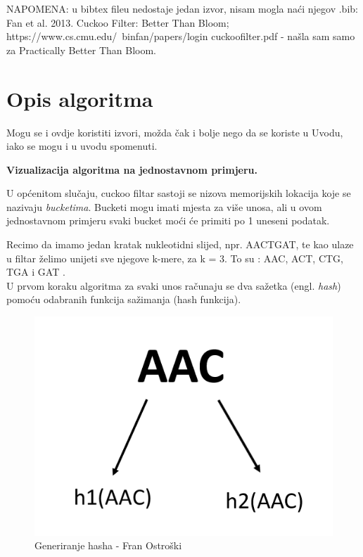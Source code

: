 \documentclass[times, utf8, seminar, numeric]{fer}
\begin{document}
NAPOMENA: u bibtex fileu nedostaje jedan izvor, nisam mogla naći njegov .bib: 
Fan et al. 2013. Cuckoo Filter: Better Than Bloom; https://www.cs.cmu.edu/~binfan/papers/login cuckoofilter.pdf - našla sam samo za Practically Better Than Bloom.

\chapter{Opis algoritma}
Mogu se i ovdje koristiti izvori, možda čak i bolje nego da se koriste u Uvodu, iako se mogu i u uvodu spomenuti.

\begin{flushleft}
\textbf{Vizualizacija algoritma na jednostavnom primjeru.}
\end{flushleft}


U općenitom slučaju, cuckoo filtar sastoji se nizova memorijskih lokacija koje se nazivaju \textit{bucketima}. Bucketi mogu imati mjesta za više unosa, ali u ovom jednostavnom primjeru svaki bucket moći će primiti  po 1 uneseni podatak.

Recimo da imamo jedan kratak nukleotidni slijed, npr. AACTGAT, te kao ulaze u filtar želimo unijeti sve njegove k-mere, za k = 3. To su : AAC, ACT, CTG, TGA i GAT . \\
U prvom koraku algoritma za svaki unos računaju se dva sažetka (engl. \textit{hash}) pomoću odabranih funkcija sažimanja (hash funkcija).

\begin{figure}[H]
  \centering
  \setlength{\intextsep}{5pt}
  \includegraphics[scale = 0.75]{images/hashing.png}
  \caption{Generiranje hasha - Fran Ostroški}
  \label{fig_hash}
\end{figure}
\end{document}
